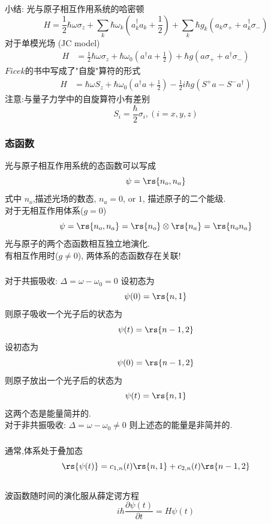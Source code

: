 \begin{frame} 
    \frametitle{}
        小结: 光与原子相互作用系统的哈密顿
             \[ H= \frac{1}{2}\hbar \omega \sigma_z + \sum_k \hbar \omega_k (a^{\dagger} _k a_k+\frac{1}{2}) + \sum_k \hbar g_k ( a_k \sigma_++  a_k ^{\dagger} \sigma_{-} )\]
        对于单模光场 (JC model)
    \[\begin{aligned}
        H &= \frac{1}{2}\hbar \omega \sigma_z + \hbar \omega_0 (a^{\dagger}  a +\frac{1}{2}) + \hbar g ( a \sigma_+ + a ^{\dagger} \sigma_{-}) 
    \end{aligned} \] 
    $Ficek$的书中写成了"自旋"算符的形式 
    \[\begin{aligned}
        H &= \hbar \omega S_z + \hbar \omega_0 (a^{\dagger}  a +\frac{1}{2}) - \frac{1}{2} i \hbar g (S^{+} a - S^{-} a ^{\dagger})
    \end{aligned} \]
    注意:与量子力学中的自旋算符小有差别 
    \[ S_i =\frac{\hbar}{2} \sigma_i, (i=x,y,z)\]
    \end{frame}

\begin{frame} 
    \frametitle{态函数}
        光与原子相互作用系统的态函数可以写成
        \[ \psi= \rs{n_o, n_a} \]
        式中 $n_o$,描述光场的数态, $n_a= 0$, or $1$, 描述原子的二个能级. \\ 
        对于无相互作用体系($g=0$)
        \[ \psi= \rs{n_o, n_a} = \rs{n_o}\otimes \rs{n_a} =\rs{n_o n_a} \]
        光与原子的两个态函数相互独立地演化. \\ 
        有相互作用时($g \not = 0$), 两体系的态函数存在关联!\\ 
    \end{frame}

    \begin{frame} 
    \frametitle{}
    {\Bullet} 对于共振吸收: $\Delta = \omega - \omega_0 =0 $
    设初态为 \[ \psi(0)= \rs{n, 1} \]
    则原子吸收一个光子后的状态为 \[ \psi(t)= \rs{n-1, 2} \]
    设初态为 \[ \psi(0)= \rs{n-1, 2} \]
    则原子放出一个光子后的状态为 \[ \psi(t)= \rs{n, 1} \]
    这两个态是能量简并的. \\
    对于非共振吸收: $\Delta = \omega - \omega_0 \not = 0 $
    则上述态的能量是非简并的. 
    \end{frame}

    \begin{frame} 
    \frametitle{}
    {\Bullet} 通常,体系处于叠加态
        \[ \rs{\psi(t)}= c_{1,n}(t) \rs{n, 1} + c_{2,n}(t) \rs{n-1, 2}  \]
    ~\\  
    波函数随时间的演化服从薛定谔方程
    \[ i \hbar \frac{\partial \psi(t)}{\partial t} = H \psi(t) \]
    \end{frame}

